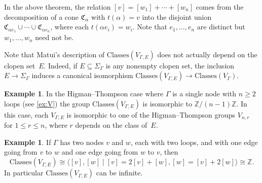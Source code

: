\documentclass[11pt,letterpaper]{amsart}
\theoremstyle{definition}
\newtheorem{example}[theorem]{Example}
\newcommand{\Z}{\mathbb{Z}}
\newcommand{\C}{\mathfrak{C}}
\newcommand{\Classes}{\mathrm{Classes}}
\begin{document}
In the above theorem, the relation $[v]=[w_1]+\cdots +[w_n]$ comes from the decomposition of a cone $\C_{\alpha}$ with $t(\alpha)=v$ into the disjoint union $\C_{\alpha e_1}\cup \cdots \cup \C_{\alpha e_n}$, where each $t(\alpha e_i)=w_i$.  Note that $e_1,\ldots,e_n$ are distinct but $w_1,\ldots,w_n$ need not be.

Note that Matui's description of $\Classes(V_{\Gamma,E})$ does not actually depend on the clopen set~$E$.  Indeed, if $E\subseteq \Sigma_\Gamma$ is any nonempty clopen set, the inclusion $E\to \Sigma_{\Gamma}$ induces a canonical isomorphism $\Classes(V_{\Gamma,E})\to \Classes(V_\Gamma)$.


\begin{example}\label{ex:ClassesInHigmanThompson}
In the Higman--Thompson case where $\Gamma$ is a single node with $n\geq 2$ loops (see \cref{ex:V}) the group $\Classes(V_{\Gamma,E})$ is isomorphic to $\Z/(n-1)\Z$. In this case, each $V_{\Gamma,E}$ is isomorphic to one of the Higman--Thompson groups $V_{n,r}$ for $1\leq r\leq n$, where $r$ depends on the class of~$E$.
\end{example}

\begin{example}
If $\Gamma$ has two nodes $v$ and $w$, each with two loops, and with one edge going from $v$ to $w$ and one edge going from $w$ to $v$, then
\[
\Classes(V_{\Gamma,E}) \cong \langle [v],[w] \mid [v]=2[v]+[w],[w]=[v]+2[w]\rangle \cong \Z.
\]
In particular $\Classes(V_{\Gamma,E})$ can be infinite.
\end{example}
\end{document}
